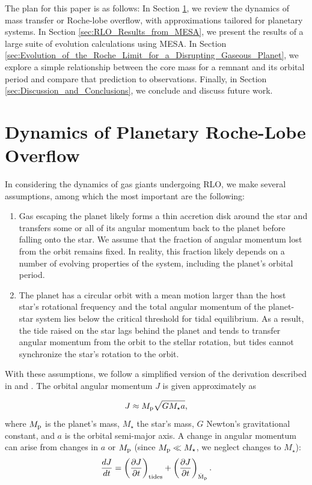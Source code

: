 \documentclass{svjour3}                     %
\begin{document}
The plan for this paper is as follows: In Section \ref{sec:dynamics_of_planetary_rochelobe_overflow}, we review the dynamics of mass transfer or Roche-lobe overflow, with approximations tailored for planetary systems. In Section \ref{sec:RLO_Results_from_MESA}, we present the results of a large suite of evolution calculations using MESA. In Section \ref{sec:Evolution_of_the_Roche_Limit_for_a_Disrupting_Gaseous_Planet}, we explore a simple relationship between the core mass for a remnant and its orbital period and compare that prediction to observations. Finally, in Section \ref{sec:Discussion_and_Conclusions}, we conclude and discuss future work.

\section{Dynamics of Planetary Roche-Lobe Overflow}
\label{sec:dynamics_of_planetary_rochelobe_overflow}
In considering the dynamics of gas giants undergoing RLO, we make several assumptions, among which the most important are the following:

\begin{enumerate}
\item Gas escaping the planet likely forms a thin accretion disk around the star and transfers some or all of its angular momentum back to the planet before falling onto the star. We assume that the fraction of angular momentum lost from the orbit remains fixed. In reality, this fraction likely depends on a number of evolving properties of the system, including the planet's orbital period.

\item The planet has a circular orbit with a mean motion larger than the host star's rotational frequency and the total angular momentum of the planet-star system lies below the critical threshold for tidal equilibrium. As a result, the tide raised on the star lags behind the planet and tends to transfer angular momentum from the orbit to the stellar rotation, but tides cannot synchronize the star's rotation to the orbit.

\end{enumerate}

With these assumptions, we follow a simplified version of the derivation described in \cite{Rappaport1982} and \cite{2015ApJ...813..101V}. The orbital angular momentum $J$ is given approximately as 

\begin{equation}
J \approx M_{\rm p} \sqrt{G M_{\star} a},
\label{eqn:orbital_angular_momentum}
\end{equation}
where $M_{\rm p}$ is the planet's mass, $M_\star$ the star's mass, $G$ Newton's gravitational constant, and $a$ is the orbital semi-major axis. A change in angular momentum can arise from changes in $a$ or $M_{\rm p}$ (since $M_{\rm p} \ll M_{\star}$, we neglect changes to $M_{\star}$):
\begin{equation}
\frac{dJ}{dt} = \left(\frac{\partial J}{\partial t}\right)_{\rm tides} + \left(\frac{\partial J}{\partial t}\right)_{\rm \dot{M}_{\rm p}}.
\label{eqn:change_in_orbital_angular_momentum}
\end{equation}
\end{document}
